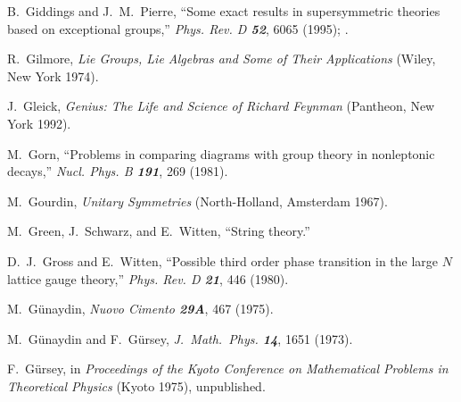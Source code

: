  B.~Giddings and J.~M.~Pierre,
    ``Some exact results in supersymmetric theories
      based on exceptional groups,''
{\em Phys.  Rev.   D \bf 52}, 6065 (1995);
.

 R.~Gilmore,
    {\em Lie Groups, Lie Algebras and Some of Their Applications}
    (Wiley, New York 1974).

 J.~Gleick,
    {\em Genius: The Life and Science of Richard Feynman}
    (Pantheon, New York 1992).


 M.~Gorn,
``Problems in comparing diagrams with group theory in nonleptonic decays,''
{\em Nucl.  Phys.  B  \bf 191}, 269 (1981).

 M.~Gourdin,
{\em Unitary Symmetries}
(North-Holland, Amsterdam 1967).

M.~Green, J.~Schwarz, and E.~Witten,
    ``String theory.''

 D.~J.~Gross and E.~Witten,
    ``Possible third order phase transition in
      the large $N$ lattice gauge theory,''
    {\em Phys.  Rev.    D \bf 21}, 446 (1980).

 M.~G{\"u}naydin,
{\em Nuovo Cimento  \bf 29A}, 467 (1975).

M.~G{\"u}naydin and F.~G{\"u}rsey,
{\em J.~Math.~Phys.  \bf 14}, 1651 (1973).

F.~G{\"u}rsey,
in {\em Proceedings of the Kyoto Conference on Mathematical Problems in Theoretical
Physics} (Kyoto 1975), unpublished.


